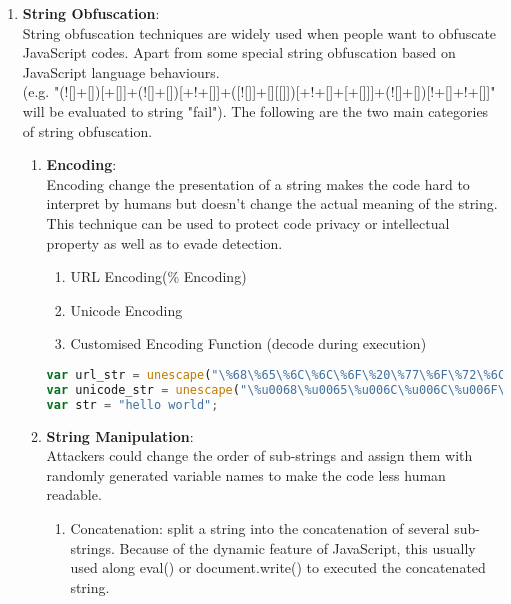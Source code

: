 \begin{enumerate}
 			Same number can be expressed in different ways by using basic arithmetic operations. (e.g. var x = 10, var x = 5+5, var x = 1000/100, etc.)
	\item \textbf{String Obfuscation}: \\
	String obfuscation techniques are widely used when people want to obfuscate JavaScript codes. Apart from some special string obfuscation based on JavaScript language behaviours. \\ (e.g. "(![]+[])[+[]]+(![]+[])[+!+[]]+([![]]+[][[]])[+!+[]+[+[]]]+(![]+[])[!+[]+!+[]]" will be evaluated to string "fail"). The following are the two main categories of string obfuscation.
	\begin{enumerate}
 		\item \textbf{Encoding}: \\
 		 Encoding change the presentation of a string makes the code hard to interpret by humans but doesn't change the actual meaning of the string. This technique can be used to protect code privacy or intellectual property as well as to evade detection. 
		\begin{enumerate}
			\item URL Encoding(\% Encoding)
			\item Unicode Encoding
			\item Customised Encoding Function (decode during execution)
 		\end{enumerate}
			\begin{lstlisting}[language=JavaScript, title=(encoding examples)]
var url_str = unescape("\%68\%65\%6C\%6C\%6F\%20\%77\%6F\%72\%6C\%64"));
var unicode_str = unescape("\%u0068\%u0065\%u006C\%u006C\%u006F\%u0020                          \%u0077\%u006F\%u0072\%u006C\%u0064");
var str = "hello world";
			\end{lstlisting}	
		\item  \textbf{String Manipulation}: \\
		Attackers could change the order of sub-strings and assign them with randomly generated variable names to make the code less human readable.
		\begin{enumerate}
			\item Concatenation: split a string into the concatenation of several sub-strings. Because of the dynamic feature of JavaScript, this usually used along eval() or document.write() to executed the concatenated string.

\end{enumerate}
\end{enumerate}
\end{enumerate}
